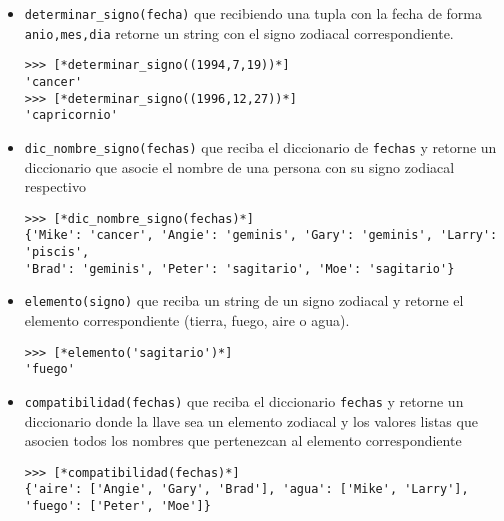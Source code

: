 \begin{itemize}
    \item \texttt{determinar\_signo(fecha)} que recibiendo una tupla con la fecha de forma \texttt{anio,mes,dia} retorne un string con el signo zodiacal correspondiente.
\begin{lstlisting}[style=consola]
>>> [*determinar_signo((1994,7,19))*]
'cancer'
>>> [*determinar_signo((1996,12,27))*]
'capricornio'
\end{lstlisting}
    \item \texttt{dic\_nombre\_signo(fechas)} que reciba el diccionario de \texttt{fechas} y retorne un diccionario que asocie el nombre de una persona con su signo zodiacal respectivo
\begin{lstlisting}[style=consola]
>>> [*dic_nombre_signo(fechas)*]
{'Mike': 'cancer', 'Angie': 'geminis', 'Gary': 'geminis', 'Larry': 'piscis', 
'Brad': 'geminis', 'Peter': 'sagitario', 'Moe': 'sagitario'}
\end{lstlisting}
    \item \texttt{elemento(signo)} que reciba un string de un signo zodiacal y retorne el elemento correspondiente (tierra, fuego, aire o agua).
\begin{lstlisting}[style=consola]
>>> [*elemento('sagitario')*]
'fuego'
\end{lstlisting}
    \item \texttt{compatibilidad(fechas)} que reciba el diccionario \texttt{fechas} y retorne un diccionario donde la llave sea un elemento zodiacal y los valores listas que asocien todos los nombres que pertenezcan al elemento correspondiente
\begin{lstlisting}[style=consola]
>>> [*compatibilidad(fechas)*]
{'aire': ['Angie', 'Gary', 'Brad'], 'agua': ['Mike', 'Larry'],
'fuego': ['Peter', 'Moe']}
\end{lstlisting}

\end{itemize}
